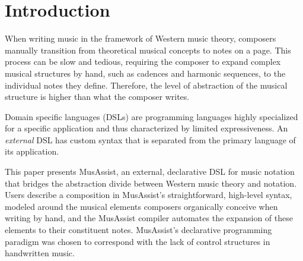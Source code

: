 \documentclass{article}
\title{\papertitle}
\begin{document}
%
\capstartfalse
\maketitle
\capstarttrue
%
\begin{abstract}
MusAssist is an external, declarative, domain specific language for music notation that bridges the abstraction gap between Western music theory and composition. Users can describe unique high-level templates for chords and arpeggios (all triads and seventh chords), scales (diatonic, chromatic, and whole tone), the five primary cadences, and the four primary harmonic sequences with desired length. Distinctively, MusAssist matches the level of abstraction of a template to the theoretical musical structure it describes (e.g. users can specify a harmonic sequence without needing to manually expand it to the chords and notes it comprises). Thus, users can write out specifications precisely at the conceptual levels of the musical structures they would organically conceive when composing by hand. In MusAssist, users can also change key signatures, start a new measure, and describe fundamental musical objects such as notes, rests, and customized chords. The Haskell-based MusAssist compiler expands high-level templates (thus lowering the level of abstraction to individual notes) and translates the program to MusicXML, a language accepted by most major music notation software, for further manual editing and playback.
\end{abstract}
%

\section{Introduction}\label{sec:introduction}
When writing music in the framework of Western music theory, composers manually transition from theoretical musical concepts to notes on a page. This process can be slow and tedious, requiring the composer to expand complex musical structures by hand, such as cadences and harmonic sequences, to the individual notes they define. Therefore, the level of abstraction of the musical structure is higher than what the composer writes.

Domain specific languages (DSLs) are programming languages highly specialized for a specific application and thus characterized by limited expressiveness. An \textit{external} DSL has custom syntax that is separated from the primary language of its application.

This paper presents MusAssist, an external, declarative DSL for music notation that bridges the abstraction divide between Western music theory and notation. Users describe a composition in MusAssist’s straightforward, high-level syntax, modeled around the musical elements composers organically conceive when writing by hand, and the MusAssist compiler automates the expansion of these elements to their
constituent notes. MusAssist’s declarative programming paradigm was chosen to correspond with the lack of control structures in handwritten music.
\end{document}
